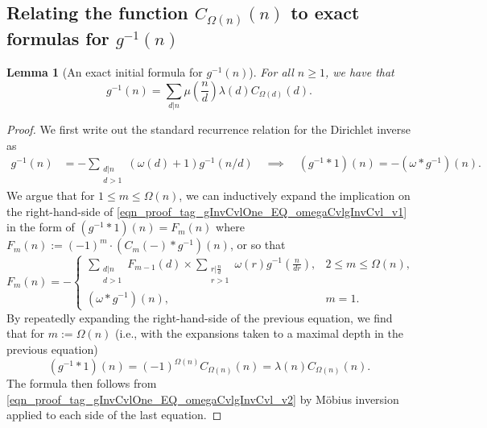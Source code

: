 \documentclass[11pt,reqno,a4letter]{article}
\numberwithin{figure}{section}
\numberwithin{table}{section}
\theoremstyle{plain}
\newtheorem{lemma}[theorem]{Lemma}
\numberwithin{theorem}{section}
\theoremstyle{definition}
\begin{document}
\subsection{Relating the function $C_{\Omega(n)}(n)$ to exact formulas for $g^{-1}(n)$} 
\label{subSection_Relating_CknFuncs_to_gInvn} 

\begin{lemma}[An exact initial formula for $g^{-1}(n)$] 
\label{lemma_AnExactFormulaFor_gInvByMobiusInv_v1} 
For all $n \geq 1$, we have that 
\[
g^{-1}(n) = \sum_{d|n} \mu\left(\frac{n}{d}\right) \lambda(d) C_{\Omega(d)}(d). 
\]
\end{lemma}
\begin{proof} 
We first write out the standard recurrence relation for the Dirichlet inverse as 
\begin{align} 
\label{eqn_proof_tag_gInvCvlOne_EQ_omegaCvlgInvCvl_v1} 
g^{-1}(n) & = - \sum_{\substack{d|n \\ d>1}} (\omega(d) + 1) g^{-1}(n/d) 
     \quad\implies\quad 
     (g^{-1} \ast 1)(n) = -(\omega \ast g^{-1})(n). 
\end{align} 
We argue that for $1 \leq m \leq \Omega(n)$, we can inductively expand the 
implication on the right-hand-side of \eqref{eqn_proof_tag_gInvCvlOne_EQ_omegaCvlgInvCvl_v1} 
in the form of $(g^{-1} \ast 1)(n) = F_m(n)$ where 
$F_m(n) := (-1)^{m} \cdot (C_m(-) \ast g^{-1})(n)$, or so that 
\[
F_m(n) = - 
     \begin{cases} 
     \sum\limits_{\substack{d|n \\ d > 1}} F_{m-1}(d) \times \sum\limits_{\substack{r|\frac{n}{d} \\ r > 1}} 
     \omega(r) g^{-1}\left(\frac{n}{dr}\right), & 2 \leq m \leq \Omega(n), \\ 
     (\omega \ast g^{-1})(n), & m = 1. 
     \end{cases} 
\]
By repeatedly expanding the right-hand-side of the previous equation, 
we find that for $m := \Omega(n)$ (i.e., with the expansions taken to a 
maximal depth in the previous equation) 
\begin{equation} 
\label{eqn_proof_tag_gInvCvlOne_EQ_omegaCvlgInvCvl_v2} 
(g^{-1} \ast 1)(n) = (-1)^{\Omega(n)} C_{\Omega(n)}(n) = \lambda(n) C_{\Omega(n)}(n). 
\end{equation} 
The formula then follows from \eqref{eqn_proof_tag_gInvCvlOne_EQ_omegaCvlgInvCvl_v2} 
by M\"obius inversion applied to each side of the last equation. 
\end{proof} 
\end{document}
